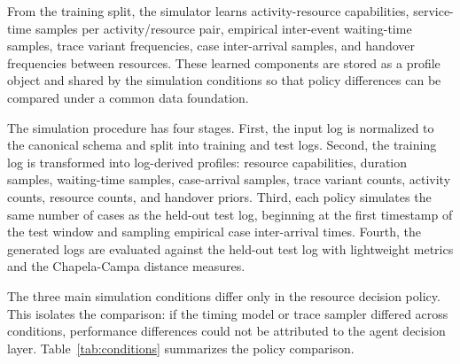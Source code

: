 From the training split, the simulator learns activity-resource
capabilities, service-time samples per activity/resource pair, empirical
inter-event waiting-time samples, trace variant frequencies, case
inter-arrival samples, and handover frequencies between resources. These
learned components are stored as a profile object and shared by the
simulation conditions so that policy differences can be compared under a
common data foundation.

The simulation procedure has four stages. First, the input log is
normalized to the canonical schema and split into training and test
logs. Second, the training log is transformed into log-derived profiles:
resource capabilities, duration samples, waiting-time samples,
case-arrival samples, trace variant counts, activity counts, resource
counts, and handover priors. Third, each policy simulates the same
number of cases as the held-out test log, beginning at the first
timestamp of the test window and sampling empirical case inter-arrival
times. Fourth, the generated logs are evaluated against the held-out
test log with lightweight metrics and the Chapela-Campa distance
measures.

The three main simulation conditions differ only in the resource
decision policy. This isolates the comparison: if the timing model or
trace sampler differed across conditions, performance differences could
not be attributed to the agent decision layer. Table~\ref{tab:conditions}
summarizes the policy comparison.


